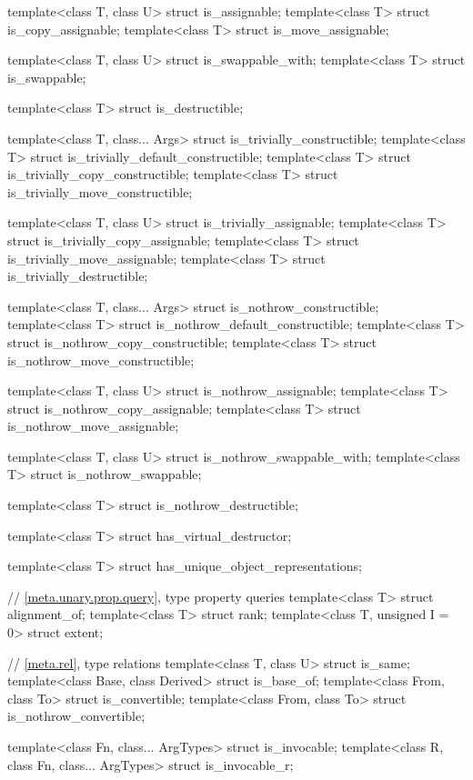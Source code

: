 \begin{codeblock}
{  template<class T, class U> struct is_assignable;
  template<class T> struct is_copy_assignable;
  template<class T> struct is_move_assignable;

  template<class T, class U> struct is_swappable_with;
  template<class T> struct is_swappable;

  template<class T> struct is_destructible;

  template<class T, class... Args> struct is_trivially_constructible;
  template<class T> struct is_trivially_default_constructible;
  template<class T> struct is_trivially_copy_constructible;
  template<class T> struct is_trivially_move_constructible;

  template<class T, class U> struct is_trivially_assignable;
  template<class T> struct is_trivially_copy_assignable;
  template<class T> struct is_trivially_move_assignable;
  template<class T> struct is_trivially_destructible;

  template<class T, class... Args> struct is_nothrow_constructible;
  template<class T> struct is_nothrow_default_constructible;
  template<class T> struct is_nothrow_copy_constructible;
  template<class T> struct is_nothrow_move_constructible;

  template<class T, class U> struct is_nothrow_assignable;
  template<class T> struct is_nothrow_copy_assignable;
  template<class T> struct is_nothrow_move_assignable;

  template<class T, class U> struct is_nothrow_swappable_with;
  template<class T> struct is_nothrow_swappable;

  template<class T> struct is_nothrow_destructible;

  template<class T> struct has_virtual_destructor;

  template<class T> struct has_unique_object_representations;

  // \ref{meta.unary.prop.query}, type property queries
  template<class T> struct alignment_of;
  template<class T> struct rank;
  template<class T, unsigned I = 0> struct extent;

  // \ref{meta.rel}, type relations
  template<class T, class U> struct is_same;
  template<class Base, class Derived> struct is_base_of;
  template<class From, class To> struct is_convertible;
  template<class From, class To> struct is_nothrow_convertible;

  template<class Fn, class... ArgTypes> struct is_invocable;
  template<class R, class Fn, class... ArgTypes> struct is_invocable_r;

}
\end{codeblock}
